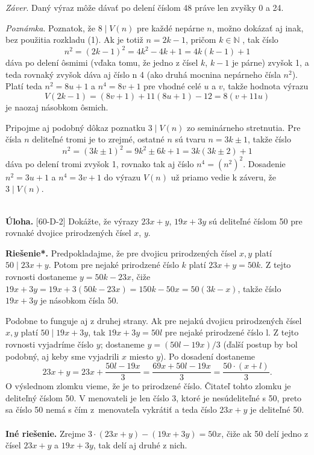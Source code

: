 \documentclass[11pt,a4paper,oneside,final]{book}
\newcommand{\NN}{\mathbb{N}}
\newcommand{\ul}{\textbf{Úloha.} }
\newcommand{\rieh}{\textbf{Riešenie*.} }
\begin{document}
\textit{Záver}. Daný výraz môže dávať po delení číslom 48 práve len zvyšky 0 a 24.

\textit{Poznámka}. Poznatok, že $8 \mid V (n)$ pre každé nepárne $n$, možno dokázať aj inak, bez použitia rozkladu (1). Ak je totiž $n = 2k - 1$, pričom $k \in \NN$ , tak číslo
$$n^2= (2k - 1)^2= 4k^2 - 4k + 1 = 4k(k - 1) + 1$$
dáva po delení ôsmimi (vďaka tomu, že jedno z čísel $k$, $k - 1$ je párne) zvyšok 1, a teda rovnaký zvyšok dáva aj číslo n 4 (ako druhá mocnina nepárneho čísla $n^2$). Platí teda $n^2 = 8u + 1$ a $n^4 = 8v + 1$ pre vhodné celé $u$ a $v$, takže hodnota výrazu
$$V (2k - 1) = (8v + 1) + 11(8u + 1) - 12 = 8(v + 11u)$$
je naozaj násobkom ôsmich.

Pripojme aj podobný dôkaz poznatku $3 \mid V (n)$ zo seminárneho stretnutia. Pre čísla $n$ deliteľné tromi je to zrejmé, ostatné $n$ sú tvaru $n = 3k \pm 1$, takže číslo
$$n^2= (3k \pm 1)^2= 9k^2 \pm 6k + 1 = 3k(3k \pm 2) + 1$$
dáva po delení tromi zvyšok 1, rovnako tak aj číslo $n^4 = (n^2)^2$. Dosadenie $n^2 = 3u + 1$ a $n^4 = 3v + 1$ do výrazu $V (n)$ už priamo vedie k záveru, že $3 \mid V (n)$.\\
\\
\begin{tcolorbox}[breakable,notitle,boxrule=0pt,colback=light-gray,colframe=light-gray]\ul [60-D-2]
Dokážte, že výrazy $23x + y$, $19x + 3y$ sú deliteľné číslom 50 pre rovnaké dvojice prirodzených čísel $x$, $y$.

\end{tcolorbox}

\rieh Predpokladajme, že pre dvojicu prirodzených čísel $x, y$ platí $50 \mid 23x + y$. Potom pre nejaké prirodzené číslo $k$ platí $23x + y = 50k$. Z tejto rovnosti dostaneme $y = 50k - 23x$, čiže $19x + 3y = 19x + 3(50k - 23x) = 150k - 50x = 50(3k - x)$, takže číslo $19x + 3y$ je násobkom čísla 50.

Podobne to funguje aj z druhej strany. Ak pre nejakú dvojicu prirodzených čísel $x,y$ platí $50 \mid 19x + 3y$, tak $19x + 3y = 50l$ pre nejaké prirodzené číslo l. Z tejto rovnosti vyjadríme číslo $y$; dostaneme $y = (50l - 19x)/3$ (ďalší postup by bol podobný, aj keby sme vyjadrili $x$ miesto $y$). Po dosadení dostaneme $$23x + y = 23x + \frac{50l - 19x}{3}=\frac{69x + 50l - 19x}{3}=\frac{50 \cdot (x + l)}{3}.$$
O výslednom zlomku vieme, že je to prirodzené číslo. Čitateľ tohto zlomku je deliteľný číslom 50. V menovateli je len číslo 3, ktoré je nesúdeliteľné s 50, preto sa číslo 50 nemá s čím z~menovateľa vykrátiť a teda číslo $23x + y$ je deliteľné 50.\\
\\
\textbf{Iné riešenie.} Zrejme $3 \cdot (23x + y) - (19x + 3y) = 50x$, čiže ak 50 delí jedno z čísel $23x + y$ a $19x + 3y$, tak delí aj druhé z nich.\\
\end{document}
